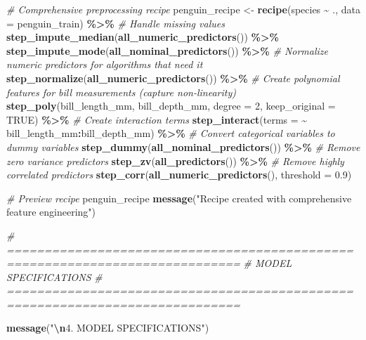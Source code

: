 \documentclass[
]{article}
\newenvironment{Shaded}{\begin{snugshade}}{\end{snugshade}}
\newcommand{\AttributeTok}[1]{\textcolor[rgb]{0.13,0.29,0.53}{#1}}
\newcommand{\CommentTok}[1]{\textcolor[rgb]{0.56,0.35,0.01}{\textit{#1}}}
\newcommand{\ConstantTok}[1]{\textcolor[rgb]{0.56,0.35,0.01}{#1}}
\newcommand{\DecValTok}[1]{\textcolor[rgb]{0.00,0.00,0.81}{#1}}
\newcommand{\FloatTok}[1]{\textcolor[rgb]{0.00,0.00,0.81}{#1}}
\newcommand{\FunctionTok}[1]{\textcolor[rgb]{0.13,0.29,0.53}{\textbf{#1}}}
\newcommand{\NormalTok}[1]{#1}
\newcommand{\OtherTok}[1]{\textcolor[rgb]{0.56,0.35,0.01}{#1}}
\newcommand{\SpecialCharTok}[1]{\textcolor[rgb]{0.81,0.36,0.00}{\textbf{#1}}}
\newcommand{\StringTok}[1]{\textcolor[rgb]{0.31,0.60,0.02}{#1}}
\begin{document}
\begin{Shaded}
\begin{Highlighting}[]
\CommentTok{\# Comprehensive preprocessing recipe}
\NormalTok{penguin\_recipe }\OtherTok{\textless{}{-}} \FunctionTok{recipe}\NormalTok{(species }\SpecialCharTok{\textasciitilde{}}\NormalTok{ ., }\AttributeTok{data =}\NormalTok{ penguin\_train) }\SpecialCharTok{\%\textgreater{}\%}
  \CommentTok{\# Handle missing values}
  \FunctionTok{step\_impute\_median}\NormalTok{(}\FunctionTok{all\_numeric\_predictors}\NormalTok{()) }\SpecialCharTok{\%\textgreater{}\%}
  \FunctionTok{step\_impute\_mode}\NormalTok{(}\FunctionTok{all\_nominal\_predictors}\NormalTok{()) }\SpecialCharTok{\%\textgreater{}\%}
  \CommentTok{\# Normalize numeric predictors for algorithms that need it}
  \FunctionTok{step\_normalize}\NormalTok{(}\FunctionTok{all\_numeric\_predictors}\NormalTok{()) }\SpecialCharTok{\%\textgreater{}\%}
  \CommentTok{\# Create polynomial features for bill measurements (capture non{-}linearity)}
  \FunctionTok{step\_poly}\NormalTok{(bill\_length\_mm, bill\_depth\_mm, }\AttributeTok{degree =} \DecValTok{2}\NormalTok{, }\AttributeTok{keep\_original =} \ConstantTok{TRUE}\NormalTok{) }\SpecialCharTok{\%\textgreater{}\%}
  \CommentTok{\# Create interaction terms}
  \FunctionTok{step\_interact}\NormalTok{(}\AttributeTok{terms =} \SpecialCharTok{\textasciitilde{}}\NormalTok{ bill\_length\_mm}\SpecialCharTok{:}\NormalTok{bill\_depth\_mm) }\SpecialCharTok{\%\textgreater{}\%}
  \CommentTok{\# Convert categorical variables to dummy variables}
  \FunctionTok{step\_dummy}\NormalTok{(}\FunctionTok{all\_nominal\_predictors}\NormalTok{()) }\SpecialCharTok{\%\textgreater{}\%}
  \CommentTok{\# Remove zero variance predictors}
  \FunctionTok{step\_zv}\NormalTok{(}\FunctionTok{all\_predictors}\NormalTok{()) }\SpecialCharTok{\%\textgreater{}\%}
  \CommentTok{\# Remove highly correlated predictors}
  \FunctionTok{step\_corr}\NormalTok{(}\FunctionTok{all\_numeric\_predictors}\NormalTok{(), }\AttributeTok{threshold =} \FloatTok{0.9}\NormalTok{)}

\CommentTok{\# Preview recipe}
\NormalTok{penguin\_recipe}
\FunctionTok{message}\NormalTok{(}\StringTok{"Recipe created with comprehensive feature engineering"}\NormalTok{)}

\CommentTok{\# =============================================================================}
\CommentTok{\# MODEL SPECIFICATIONS}
\CommentTok{\# =============================================================================}

\FunctionTok{message}\NormalTok{(}\StringTok{"}\SpecialCharTok{\textbackslash{}n}\StringTok{4. MODEL SPECIFICATIONS"}\NormalTok{)}


\end{Highlighting}
\end{Shaded}
\end{document}
